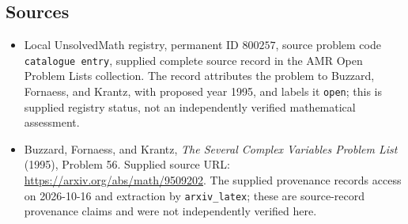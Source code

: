 \documentclass[11pt]{article}
\begin{document}
\subsection{Sources}
\begin{itemize}
\item Local UnsolvedMath registry, permanent ID \(800257\), source problem code \texttt{catalogue entry}, supplied complete source record in the AMR Open Problem Lists collection. The record attributes the problem to Buzzard, Fornaess, and Krantz, with proposed year 1995, and labels it \texttt{open}; this is supplied registry status, not an independently verified mathematical assessment.
\item Buzzard, Fornaess, and Krantz, \emph{The Several Complex Variables Problem List} (1995), Problem 56. Supplied source URL: \url{https://arxiv.org/abs/math/9509202}. The supplied provenance records access on 2026-10-16 and extraction by \texttt{arxiv\_latex}; these are source-record provenance claims and were not independently verified here.
\end{itemize}
\end{document}
